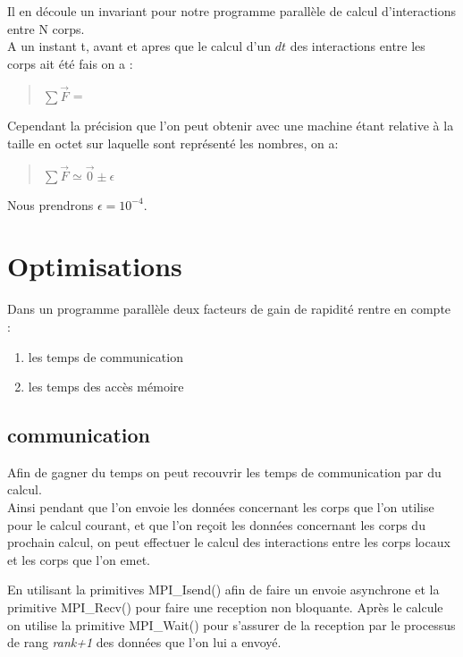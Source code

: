 \par Il en découle un invariant pour notre programme parallèle de calcul d'interactions entre N corps.\\
A un instant t, avant et apres que le calcul d'un $dt$ des interactions entre les corps ait été fais 
on a :
\begin{quote}
  \begin{center}
    $\sum \overrightarrow{F}$ = 
  \end{center}
\end{quote}

\par Cependant la précision que l'on peut obtenir avec une machine étant relative à 
la taille en octet sur laquelle sont représenté les nombres, on a:
\begin{quote}
  \begin{center}
    $\sum \overrightarrow{F} \simeq \overrightarrow{0} \pm \epsilon$
  \end{center}
\end{quote}
Nous prendrons $\epsilon = 10^{-4}$.

\section{Optimisations}

\par Dans un programme parallèle deux facteurs de gain de rapidité rentre en compte : 
\begin{enumerate}
\item les temps de communication 
\item les temps des accès mémoire
\end{enumerate}

\subsection{communication}

\par Afin de gagner du temps on peut recouvrir les temps de communication par du calcul.\\
Ainsi pendant que l'on envoie les données concernant les corps que l'on utilise pour le calcul
courant, et que l'on reçoit les données concernant les corps du prochain calcul, on peut effectuer 
le calcul des interactions entre les corps locaux et les corps que l'on emet.\\

\par En utilisant la primitives MPI\_Isend() afin de faire un envoie asynchrone et la primitive
MPI\_Recv() pour faire une reception non bloquante. Après le calcule on utilise la primitive 
MPI\_Wait() pour s'assurer de la reception par le processus de rang \textit{rank+1} des données 
que l'on lui a envoyé.\\

